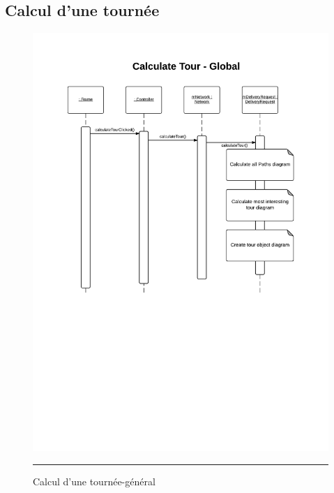 \subsection{Calcul d'une tournée}
\begin{figure}[H]
	\centering
		\includegraphics[width=\textwidth,height=\textheight,keepaspectratio]{Figures/calcul_tournee1}
		\rule{35em}{0.5pt}
	\caption[Calcul d'une tournée-général]{Calcul d'une tournée-général}
\end{figure}
\clearpage
